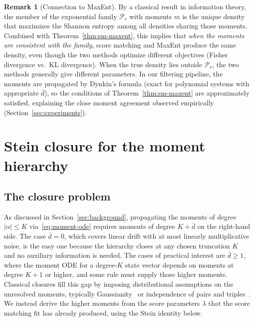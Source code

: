 \documentclass{article}
\theoremstyle{definition}
\newtheorem{remark}{Remark}
\begin{document}
\begin{remark}[Connection to MaxEnt]
By a classical result in information theory, the member of the
exponential family $\mathcal{P}_r$ with moments $m$ is the unique
density that maximizes the Shannon entropy among all densities
sharing those moments.
Combined with Theorem~\ref{thm:sm-maxent}, this implies that
\emph{when the moments are consistent with the family},
score matching and MaxEnt produce the same density,
even though the two methods optimize different objectives
(Fisher divergence vs.\ KL divergence).
When the true density lies outside $\mathcal{P}_r$,
the two methods generally give different parameters.
In our filtering pipeline, the moments are propagated by Dynkin's formula
(exact for polynomial systems with appropriate $\bar{d}$),
so the conditions of Theorem~\ref{thm:sm-maxent} are approximately
satisfied, explaining the close moment agreement observed empirically
(Section~\ref{sec:experiments}).
\end{remark}

\section{Stein closure for the moment hierarchy}
\label{sec:stein}

\subsection{The closure problem}

As discussed in Section~\ref{sec:background}, propagating the moments
of degree $|\alpha| \le K$ via~\eqref{eq:moment-ode} requires moments
of degree $K + \bar{d}$ on the right-hand side. The case $\bar{d} = 0$,
which covers linear drift with at most linearly multiplicative noise,
is the easy one because the hierarchy closes at any chosen truncation
$K$ and no auxiliary information is needed. The cases of practical
interest are $\bar{d} \ge 1$, where the moment ODE for a degree-$K$
state vector depends on moments at degree $K + 1$ or higher, and some
rule must supply those higher moments. Classical closures fill this
gap by imposing distributional assumptions on the unresolved moments,
typically Gaussianity~\cite{whittle1957} or independence of pairs and
triples~\cite{kirkwood1935,keeling1999}. We instead derive the higher
moments from the score parameters $\lambda$ that the score matching
fit has already produced, using the Stein identity below.
\end{document}
